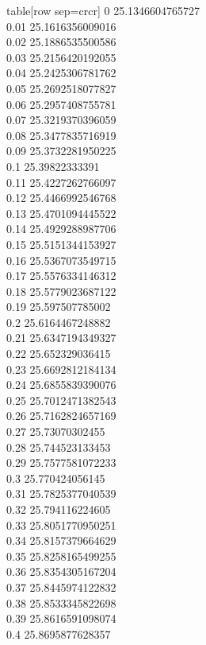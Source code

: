   table[row sep=crcr]{%
0	25.1346604765727\\
0.01	25.1616356009016\\
0.02	25.1886535500586\\
0.03	25.2156420192055\\
0.04	25.2425306781762\\
0.05	25.2692518077827\\
0.06	25.2957408755781\\
0.07	25.3219370396059\\
0.08	25.3477835716919\\
0.09	25.3732281950225\\
0.1	25.39822333391\\
0.11	25.4227262766097\\
0.12	25.4466992546768\\
0.13	25.4701094445522\\
0.14	25.4929288987706\\
0.15	25.5151344153927\\
0.16	25.5367073549715\\
0.17	25.5576334146312\\
0.18	25.5779023687122\\
0.19	25.597507785002\\
0.2	25.6164467248882\\
0.21	25.6347194349327\\
0.22	25.652329036415\\
0.23	25.6692812184134\\
0.24	25.6855839390076\\
0.25	25.7012471382543\\
0.26	25.7162824657169\\
0.27	25.73070302455\\
0.28	25.744523133453\\
0.29	25.7577581072233\\
0.3	25.770424056145\\
0.31	25.7825377040539\\
0.32	25.794116224605\\
0.33	25.8051770950251\\
0.34	25.8157379664629\\
0.35	25.8258165499255\\
0.36	25.8354305167204\\
0.37	25.8445974122832\\
0.38	25.8533345822698\\
0.39	25.8616591098074\\
0.4	25.8695877628357\\
}
